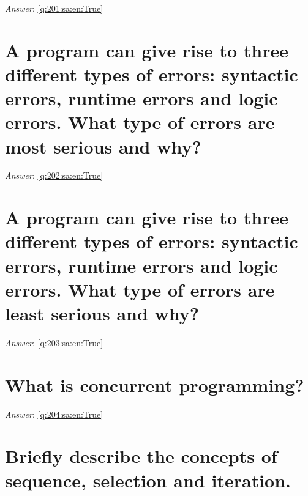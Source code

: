 \documentclass[a4paper,11pt,oneside]{book}
\begin{document}
\begin{sloppypar}
\vspace{1cm}

\textit{Answer}: \autoref{q:201:sa:en:True}



\section{A program can give rise to three different types of errors: syntactic errors, runtime errors and logic errors. What type of errors are most serious and why?}

\label{q:202:sa:en:False}

\vspace{2cm}

\noindent\makebox[\textwidth]{\hrulefill}

\vspace{1cm}

\textit{Answer}: \autoref{q:202:sa:en:True}



\section{A program can give rise to three different types of errors: syntactic errors, runtime errors and logic errors. What type of errors are least serious and why?}

\label{q:203:sa:en:False}

\vspace{2cm}

\noindent\makebox[\textwidth]{\hrulefill}

\vspace{1cm}

\textit{Answer}: \autoref{q:203:sa:en:True}



\section{What is concurrent programming?}

\label{q:204:sa:en:False}

\vspace{2cm}

\noindent\makebox[\textwidth]{\hrulefill}

\vspace{1cm}

\textit{Answer}: \autoref{q:204:sa:en:True}



\section{Briefly describe the concepts of sequence, selection and iteration.}


\end{sloppypar}
\end{document}
